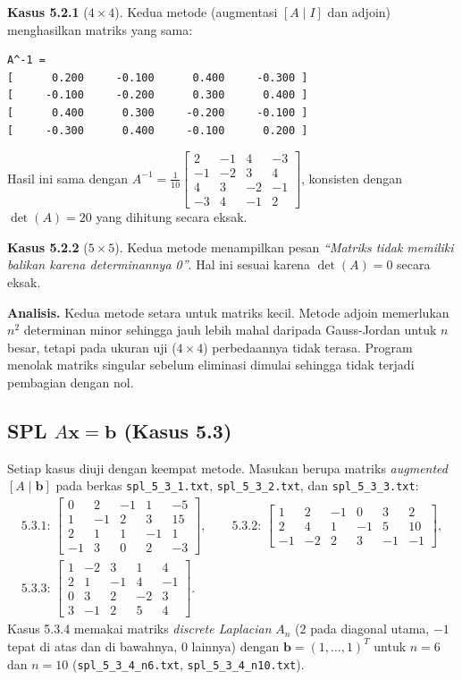 \documentclass[12pt,a4paper]{article}
\begin{document}
\textbf{Kasus 5.2.1} ($4\times4$). Kedua metode (augmentasi $[A\mid I]$ dan adjoin) menghasilkan matriks yang sama:
\begin{lstlisting}
A^-1 =
[      0.200     -0.100      0.400     -0.300 ]
[     -0.100     -0.200      0.300      0.400 ]
[      0.400      0.300     -0.200     -0.100 ]
[     -0.300      0.400     -0.100      0.200 ]
\end{lstlisting}
Hasil ini sama dengan $A^{-1}=\tfrac1{10}\left[\begin{smallmatrix}2&-1&4&-3\\-1&-2&3&4\\4&3&-2&-1\\-3&4&-1&2\end{smallmatrix}\right]$, konsisten dengan $\det(A)=20$ yang dihitung secara eksak.

\textbf{Kasus 5.2.2} ($5\times5$). Kedua metode menampilkan pesan \textit{``Matriks tidak memiliki balikan karena determinannya 0''}. Hal ini sesuai karena $\det(A)=0$ secara eksak.

\textbf{Analisis.} Kedua metode setara untuk matriks kecil. Metode adjoin memerlukan $n^2$ determinan minor sehingga jauh lebih mahal daripada Gauss-Jordan untuk $n$ besar, tetapi pada ukuran uji ($4\times4$) perbedaannya tidak terasa. Program menolak matriks singular sebelum eliminasi dimulai sehingga tidak terjadi pembagian dengan nol.

\subsection{SPL $A\mathbf{x}=\mathbf{b}$ (Kasus 5.3)}
Setiap kasus diuji dengan keempat metode. Masukan berupa matriks \textit{augmented} $[A\mid\mathbf{b}]$ pada berkas \texttt{spl\_5\_3\_1.txt}, \texttt{spl\_5\_3\_2.txt}, dan \texttt{spl\_5\_3\_3.txt}:
\begin{gather*}
\text{5.3.1: }\left[\begin{array}{rrrr|r}0&2&-1&1&-5\\1&-1&2&3&15\\2&1&1&-1&1\\-1&3&0&2&-3\end{array}\right],\qquad
\text{5.3.2: }\left[\begin{array}{rrrrr|r}1&2&-1&0&3&2\\2&4&1&-1&5&10\\-1&-2&2&3&-1&-1\end{array}\right],\\[4pt]
\text{5.3.3: }\left[\begin{array}{rrrr|r}1&-2&3&1&4\\2&1&-1&4&-1\\0&3&2&-2&3\\3&-1&2&5&4\end{array}\right].
\end{gather*}
Kasus 5.3.4 memakai matriks \textit{discrete Laplacian} $A_n$ ($2$ pada diagonal utama, $-1$ tepat di atas dan di bawahnya, $0$ lainnya) dengan $\mathbf{b}=(1,\dots,1)^T$ untuk $n=6$ dan $n=10$ (\texttt{spl\_5\_3\_4\_n6.txt}, \texttt{spl\_5\_3\_4\_n10.txt}).
\end{document}
